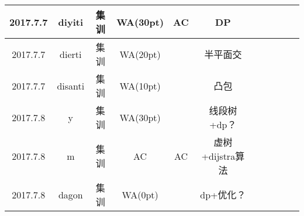 \documentclass[landscape]{article}
\begin{document}
\begin{longtable}{ccccccccccc}
  \hline
  2017.7.7 & diyiti & 集训 & WA(30pt) & AC & DP\\
  \hline
  2017.7.7 & dierti & 集训 & WA(20pt) & \color{pink}{WA(20pt)} & 半平面交\\
  \hline
  2017.7.7 & disanti & 集训 & WA(10pt) & \color{pink}{WA(10pt)} & 凸包\\
  \hline
  2017.7.8 & y & 集训 & WA(30pt) & \color{pink}{WA(30pt)} & 线段树+dp？\\
  \hline
  2017.7.8 & m & 集训 & AC & AC & 虚树+dijstra算法\\
  \hline
  2017.7.8 & dagon & 集训 & WA(0pt) & \color{pink}{WA(10pt)} & dp+优化？\\
  \hline
\end{longtable}
\end{document}
